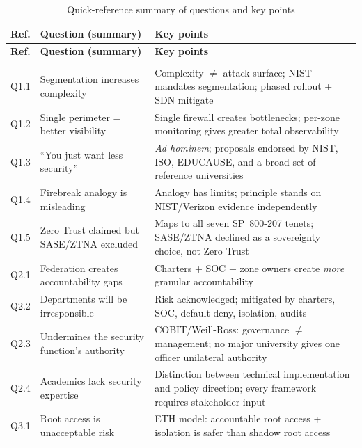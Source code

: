 \begin{longtable}{>{\raggedright}p{1cm} >{\raggedright}p{5.5cm} >{\raggedright\arraybackslash}p{7.5cm}}
\caption{Quick-reference summary of questions and key points} \label{tab:arg-summary} \\
\toprule
\textbf{Ref.} & \textbf{Question (summary)} & \textbf{Key points} \\
\midrule
\endfirsthead
\toprule
\textbf{Ref.} & \textbf{Question (summary)} & \textbf{Key points} \\
\midrule
\endhead
\midrule
\multicolumn{3}{r}{\footnotesize\itshape Continued on next page} \\
\endfoot
\bottomrule
\endlastfoot

Q1.1 & Segmentation increases complexity & Complexity $\neq$ attack surface; NIST mandates segmentation; phased rollout + SDN mitigate \\
\addlinespace
Q1.2 & Single perimeter = better visibility & Single firewall creates bottlenecks; per-zone monitoring gives greater total observability \\
\addlinespace
Q1.3 & ``You just want less security'' & \emph{Ad hominem}; proposals endorsed by NIST, ISO, EDUCAUSE, and a broad set of reference universities \\
\addlinespace
Q1.4 & Firebreak analogy is misleading & Analogy has limits; principle stands on NIST/Verizon evidence independently \\
\addlinespace
Q1.5 & Zero Trust claimed but SASE/ZTNA excluded & Maps to all seven SP~800-207 tenets; SASE/ZTNA declined as a sovereignty choice, not Zero Trust \\
\addlinespace
Q2.1 & Federation creates accountability gaps & Charters + SOC + zone owners create \emph{more} granular accountability \\
\addlinespace
Q2.2 & Departments will be irresponsible & Risk acknowledged; mitigated by charters, SOC, default-deny, isolation, audits \\
\addlinespace
Q2.3 & Undermines the security function's authority & COBIT/Weill-Ross: governance $\neq$ management; no major university gives one officer unilateral authority \\
\addlinespace
Q2.4 & Academics lack security expertise & Distinction between technical implementation and policy direction; every framework requires stakeholder input \\
\addlinespace
Q3.1 & Root access is unacceptable risk & ETH model: accountable root access + isolation is safer than shadow root access \\

\end{longtable}
